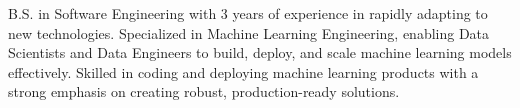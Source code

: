 

\begin{cvparagraph}

B.S. in Software Engineering with 3 years of experience in rapidly adapting to new technologies. Specialized in Machine Learning Engineering, enabling Data Scientists and Data Engineers to build, deploy, and scale machine learning models effectively. Skilled in coding and deploying machine learning products with a strong emphasis on creating robust, production-ready solutions.
\end{cvparagraph}
